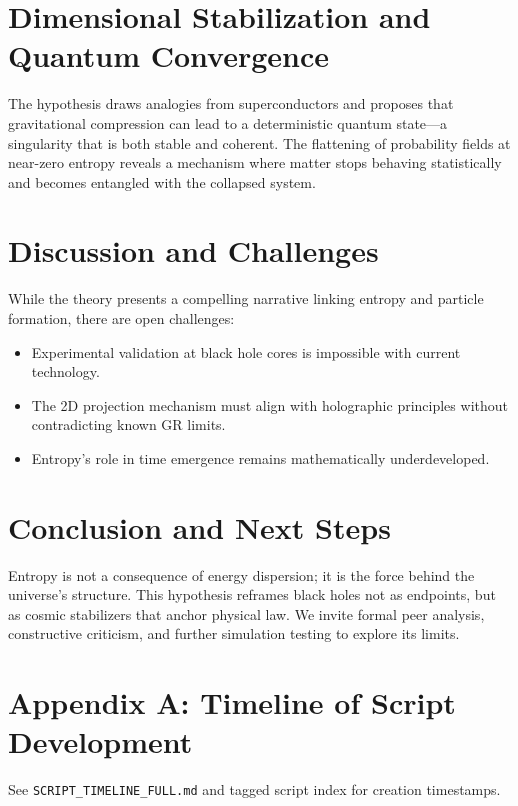 \documentclass[12pt]{article}
\begin{document}
\section{Dimensional Stabilization and Quantum Convergence}
The hypothesis draws analogies from superconductors and proposes that gravitational compression can lead to a deterministic quantum state—a singularity that is both stable and coherent. The flattening of probability fields at near-zero entropy reveals a mechanism where matter stops behaving statistically and becomes entangled with the collapsed system.

\section{Discussion and Challenges}

While the theory presents a compelling narrative linking entropy and particle formation, there are open challenges:

\begin{itemize}
    \item Experimental validation at black hole cores is impossible with current technology.
    \item The 2D projection mechanism must align with holographic principles without contradicting known GR limits.
    \item Entropy's role in time emergence remains mathematically underdeveloped.
\end{itemize}

\section{Conclusion and Next Steps}

Entropy is not a consequence of energy dispersion; it is the force behind the universe's structure. This hypothesis reframes black holes not as endpoints, but as cosmic stabilizers that anchor physical law. We invite formal peer analysis, constructive criticism, and further simulation testing to explore its limits.

\appendix

\section{Appendix A: Timeline of Script Development}

See \texttt{SCRIPT\_TIMELINE\_FULL.md} and tagged script index for creation timestamps.
\end{document}
